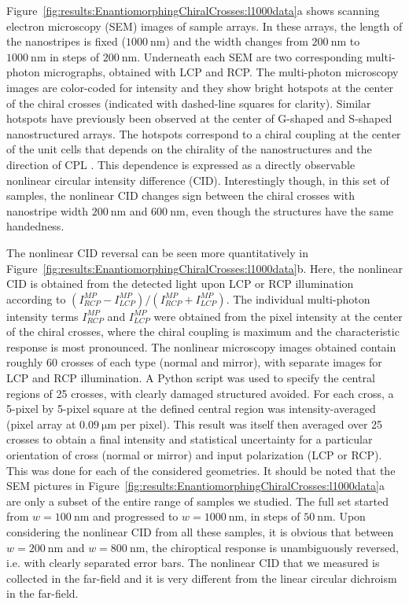 Figure~\ref{fig:results:EnantiomorphingChiralCrosses:l1000data}a shows scanning electron microscopy (SEM) images of sample arrays. In these arrays, the length of the nanostripes is fixed ($\SI{1000}{\nano\m}$) and the width changes from $\SI{200}{\nano\m}$ to $\SI{1000}{\nano\m}$ in steps of $\SI{200}{\nano\m}$. Underneath each SEM are two corresponding multi-photon micrographs, obtained with LCP and RCP. The multi-photon microscopy images are color-coded for intensity and they show bright hotspots at the center of the chiral crosses (indicated with dashed-line squares for clarity). 
Similar hotspots have previously been observed at the center of G-shaped \cite{Valev2009a} and S-shaped \cite{Valev2014} nanostructured arrays. 
The hotspots correspond to a chiral coupling at the center of the unit cells that depends on the chirality of the nanostructures and the direction of CPL \cite{ Valev2014, Petralli-Mallow1993, Byers1994}. This dependence is expressed as a directly observable nonlinear circular intensity difference (CID). Interestingly though, in this set of samples, the nonlinear CID changes sign between the chiral crosses with nanostripe width  $\SI{200}{\nano\m}$ and $\SI{600}{\nano\m}$, even though the structures have the same handedness.

The nonlinear CID reversal can be seen more quantitatively in Figure~\ref{fig:results:EnantiomorphingChiralCrosses:l1000data}b. Here, the nonlinear CID is obtained from the detected light upon LCP or RCP illumination according to 
$(I_{RCP}^{MP}-I_{LCP}^{MP})/(I_{RCP}^{MP}+I_{LCP}^{MP})$. The individual multi-photon intensity terms $I_{RCP}^{MP}$ and $I_{LCP}^{MP}$ were obtained from the pixel intensity at the center of the chiral crosses, where the chiral coupling is maximum and the characteristic response is most pronounced. 
The nonlinear microscopy images obtained contain roughly 60 crosses of each type (normal and mirror), with separate images for LCP and RCP illumination. A Python script was used to specify the central regions of 25 crosses, with clearly damaged structured avoided. For each cross, a 5-pixel by 5-pixel square at the defined central region was intensity-averaged (pixel array at $\SI{0.09}{\micro\m}$ per pixel). This result was itself then averaged over 25 crosses to obtain a final intensity and statistical uncertainty for a particular orientation of cross (normal or mirror) and input polarization (LCP or RCP). This was done for each of the considered geometries. 
It should be noted that the SEM pictures in Figure~\ref{fig:results:EnantiomorphingChiralCrosses:l1000data}a are only a subset of the entire range of samples we studied. The full set started from $w= \SI{100}{\nano\m}$ and progressed to $w=\SI{1000}{\nano\m}$, in steps of $\SI{50}{\nano\m}$. 
Upon considering the nonlinear CID from all these samples, it is obvious that between $w=\SI{200}{\nano\m}$ and $w=\SI{800}{\nano\m}$, the chiroptical response is unambiguously reversed, i.e. with clearly separated error bars. The nonlinear CID that we measured is collected in the far-field and it is very different from the linear circular dichroism in the far-field. 

